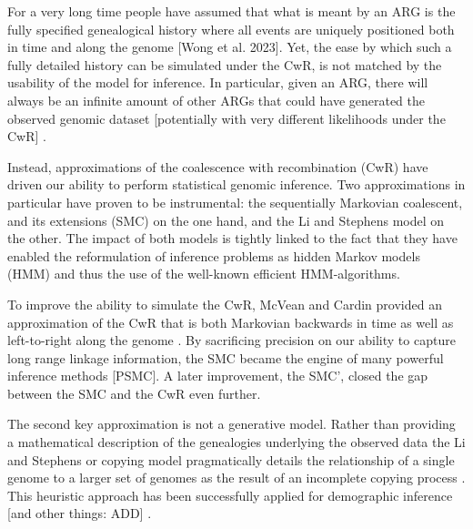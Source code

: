 \documentclass{article}
\begin{document}
For a very long time people have assumed that what is meant by an ARG is the
fully specified genealogical history where all events are uniquely positioned
both in time and along the genome [Wong et al. 2023].
Yet, the ease by which such a fully detailed history can be simulated under the
CwR, is not matched by the usability of the model for inference.
In particular, given an ARG, there will always be an infinite amount of other
ARGs that could have generated the observed genomic dataset
[potentially with very different likelihoods under the CwR]
\citep{mcvean_approximating_2005}.

Instead, approximations of the coalescence with recombination (CwR) have
driven our ability to perform statistical genomic inference. Two approximations
in particular have proven to be instrumental: the sequentially Markovian coalescent,
and its extensions (SMC) on the one hand, and the Li and Stephens model on the other.
The impact of both models is tightly linked to the fact that they have enabled
the reformulation of inference problems as hidden Markov models (HMM) and thus
the use of the well-known efficient HMM-algorithms.

To improve the ability to simulate the CwR, McVean and Cardin
provided an approximation of the CwR that is both Markovian backwards in time
as well as left-to-right along the genome \citep{mcvean_approximating_2005}.
By sacrificing precision on our ability to capture long range linkage
information, the SMC became the engine of many powerful inference methods [PSMC].
A later improvement, the SMC', closed the gap between the SMC and the
CwR even further.

The second key approximation is not a generative model. Rather than providing
a mathematical description of the genealogies underlying the observed data
the Li and Stephens or copying model pragmatically details the relationship
of a single genome to a larger set of genomes as the result of an
incomplete copying process \citep{li_modeling_2003}. This heuristic approach
has been successfully applied for demographic inference [and other things: ADD]
\citep{sheehan_estimating_2013, steinrucken_inference_2019}.
\end{document}
